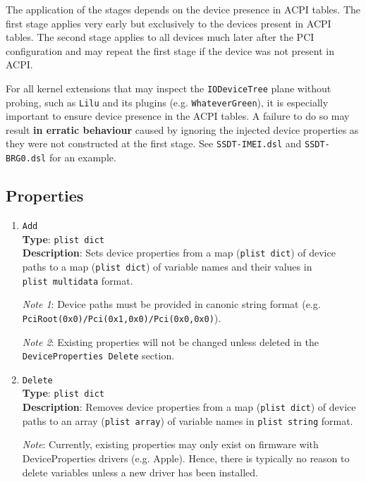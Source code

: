 \documentclass[]{article}
\begin{document}
The application of the stages depends on the device presence in ACPI tables.
The first stage applies very early but exclusively to the devices present in ACPI tables.
The second stage applies to all devices much later after the PCI configuration
and may repeat the first stage if the device was not present in ACPI.

For all kernel extensions that may inspect the \texttt{IODeviceTree} plane without probing,
such as \texttt{Lilu} and its plugins (e.g. \texttt{WhateverGreen}), it is especially
important to ensure device presence in the ACPI tables. A failure to do so may result
\textbf{in erratic behaviour} caused by ignoring the injected device properties
as they were not constructed at the first stage. See \texttt{SSDT-IMEI.dsl} and
\texttt{SSDT-BRG0.dsl} for an example.

\subsection{Properties}\label{devpropsprops}

\begin{enumerate}

\item
  \texttt{Add}\\
  \textbf{Type}: \texttt{plist\ dict}\\
  \textbf{Description}: Sets device properties from a map (\texttt{plist\ dict})
  of device paths to a map (\texttt{plist\ dict}) of variable names and their values
  in \texttt{plist\ multidata} format.

  \emph{Note 1}: Device paths must be provided in canonic string format
  (e.g. \texttt{PciRoot(0x0)/Pci(0x1,0x0)/Pci(0x0,0x0)}).

  \emph{Note 2}: Existing properties will not be changed unless deleted
  in the \texttt{DeviceProperties\ Delete} section.

\item
  \texttt{Delete}\\
  \textbf{Type}: \texttt{plist\ dict}\\
  \textbf{Description}: Removes device properties from a map (\texttt{plist\ dict})
  of device paths to an array (\texttt{plist\ array}) of variable names in
  \texttt{plist\ string} format.

  \emph{Note}: Currently, existing properties may only exist on firmware
  with DeviceProperties drivers (e.g. Apple). Hence, there is typically
  no reason to delete variables unless a new driver has been installed.

\end{enumerate}
\end{document}
